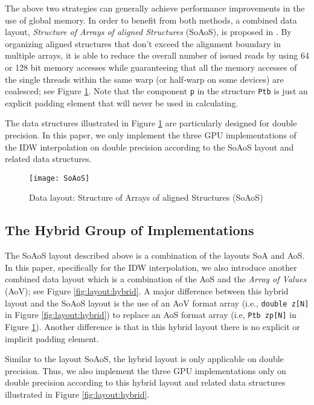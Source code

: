 The above two strategies can generally achieve performance improvements in 
the use of global memory. In order to benefit from both methods, a combined 
data layout, \textit{Structure of Arrays of aligned Structures} (SoAoS), is proposed in \cite{siegel2009}. By organizing aligned 
structures that don't exceed the alignment boundary in multiple arrays, it 
is able to reduce the overall number of issued reads by using 64 or 128 bit 
memory accesses while guaranteeing that all the memory accesses of the 
single threads within the same warp (or half-warp on some devices) are 
coalesced; see Figure \ref{fig:layout:soaos}. Note that the component \texttt{p} in the structure \texttt{Ptb} is just 
an explicit padding element that will never be used in calculating. 

The data structures illustrated in Figure \ref{fig:layout:soaos} are particularly designed for 
double precision. In this paper, we only implement the three GPU 
implementations of the IDW interpolation on double precision according to 
the SoAoS layout and related data structures.

\begin{figure}[htb]
\centering
    \texttt{[image: SoAoS]}
    \caption{Data layout: Structure of Arrays of aligned Structures (SoAoS)}
    \label{fig:layout:soaos}       \end{figure}


\subsection{The Hybrid Group of Implementations}
\label{sec:implement:hybrid}

The SoAoS layout described above is a combination of the layouts SoA and 
AoS. In this paper, specifically for the IDW interpolation, we also 
introduce another combined data layout which is a combination of the AoS and the 
\textit{Array of Values }(AoV); see Figure \ref{fig:layout:hybrid}. A major difference between this hybrid layout and the 
SoAoS layout is the use of an AoV format array (i.e., \texttt{double z[N]} in Figure \ref{fig:layout:hybrid}) to replace an AoS format array
(i.e, \texttt{Ptb zp[N]} in Figure \ref{fig:layout:soaos}). Another difference is that in this hybrid layout there 
is no explicit or implicit padding element. 

Similar to the layout SoAoS, the hybrid layout is only applicable on double 
precision. Thus, we also implement the three GPU implementations only on 
double precision according to this hybrid layout and related data structures 
illustrated in Figure \ref{fig:layout:hybrid}.


